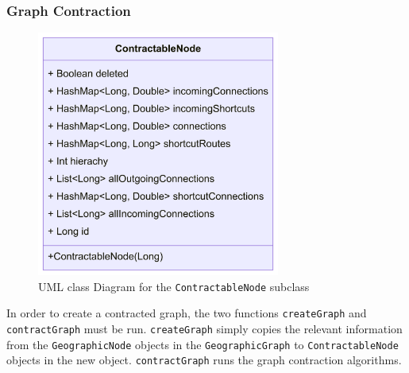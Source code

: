\documentclass[11pt,twoside,a4paper]{report}
\begin{document}
\subsubsection{Graph Contraction}
\begin{figure}[t]
\begin{center}
\includegraphics[width=8cm]{ContractableNode.png}
\end{center}
\caption{UML class Diagram for the \texttt{ContractableNode} subclass}
\label{ContractableNode}
\end{figure}
In order to create a contracted graph, the two functions \texttt{createGraph} and \texttt{contractGraph} must be run. \texttt{createGraph} simply copies the relevant information from the \texttt{GeographicNode} objects in the \texttt{GeographicGraph} to \texttt{ContractableNode} objects in the new object.
\texttt{contractGraph} runs the graph contraction algorithms.
\end{document}
